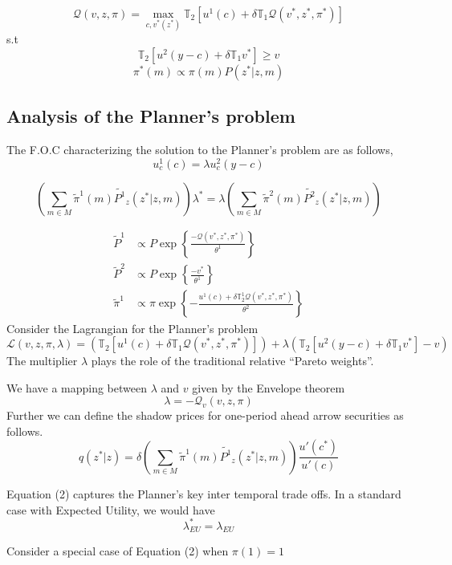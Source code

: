 \documentclass[12pt]{article}
\begin{document}
\[\mathcal{Q}(v,z,\pi)=\max_{c,v^*(z^*)} \mathbb{T}_2\left[u^1(c)+\delta \mathbb{T}_1 \mathcal{Q}(v^*,z^*,\pi^*)\right]\]
s.t
\[\mathbb{T}_2\left[u^2(y-c)+\delta \mathbb{T}_1 v^*\right]\geq v\] 
\[\pi^*(m)\propto \pi(m)P(z^*|z,m)\]

 \subsection{Analysis of the Planner's problem}
 The F.O.C characterizing the solution to the Planner's problem are as follows,
\begin{equation}
u^1_c(c)=\lambda u^2_c(y-c)
\end{equation}

\begin{equation}
\left(\sum_{m \in M}\tilde{\pi}^1(m)\tilde{P^1}_z(z^* |z,m)\right)\lambda^*=\lambda\left(\sum_{m \in M}\tilde{\pi}^2(m)\tilde{P^2}_z(z^* |z,m)\right) 
\end{equation}

\begin{subequations}
\begin{align}
\tilde{P}^1 & \propto P\exp\left\{\frac{-\mathcal{Q}(v^*,z^*,\pi^*)}{\theta^1}\right\}\\
\tilde{P}^2 & \propto P\exp\left\{\frac{-v^*}{\theta^1}\right\}\\
\tilde{\pi}^1 & \propto \pi \exp\left\{-\frac{ u^1(c)+\delta \mathbb{T}^1_2 \mathcal{Q}(v^*,z^*,\pi^*) }{\theta^2}\right\} 
\end{align}
\end{subequations}
Consider the Lagrangian for the Planner's problem
\[\mathcal{L}(v,z,\pi,\lambda) = \left(\mathbb{T}_2\left[u^1(c)+\delta \mathbb{T}_1 \mathcal{Q}(v^*,z^*,\pi^*)\right]\right)+\lambda(\mathbb{T}_2\left[u^2(y-c)+\delta \mathbb{T}_1 v^*\right]-v)\]
The multiplier $\lambda$ plays the role of the traditional relative ``Pareto weights''. 

\noindent We have a mapping between $\lambda$ and $v$ given by the Envelope theorem
\[\lambda=-\mathcal{Q}_v(v,z,\pi)\]
\noindent Further we can define the shadow prices for one-period ahead arrow securities as follows.
\[q(z^* |z )=\delta \left(\sum_{m \in M}\tilde{\pi}^1(m)\tilde{P^1}_z(z^* |z,m)\right)\frac{ u'(c^*)}{u'(c)}\]

\noindent Equation (2) captures the Planner's key inter temporal trade offs. In a standard case with Expected Utility, we would have 
\[\lambda_{EU}^*=\lambda_{EU}\]

Consider a special case of  Equation (2) when $\pi(1)=1$
\end{document}
